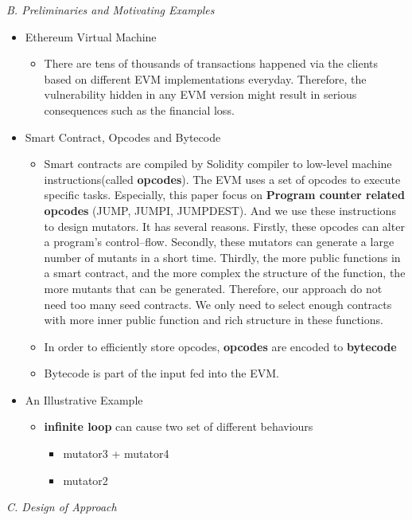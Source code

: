 \documentclass[a4paper]{article}
\begin{document}
	\textit{B. Preliminaries and Motivating Examples}
	\begin{itemize}
		\item Ethereum Virtual Machine
		\begin{itemize}
			\item  There are tens
			of thousands of transactions happened via the clients based on
			different EVM implementations everyday. Therefore, the vulnerability
			hidden in any EVM version might result in serious consequences such as the financial loss.
		\end{itemize}
		\item Smart Contract, Opcodes and Bytecode
		\begin{itemize}
			\item Smart contracts are compiled by Solidity compiler to low-level machine instructions(called \textbf{opcodes}). The EVM uses a set of opcodes to execute specific tasks. Especially, this paper focus on \textbf{Program counter related opcodes} (JUMP, JUMPI, JUMPDEST). And we use these instructions to design mutators. It has several reasons. Firstly, these opcodes can alter a program's control--flow. Secondly, these mutators can generate a large number of mutants in a short time. Thirdly, 
			the more public functions in a smart contract, and the more complex the structure of the function, the more mutants that can be generated. Therefore, our approach do not need too many seed contracts. We only need to select enough contracts with more inner public function and rich structure in these functions.
			\item In order to efficiently store opcodes, \textbf{opcodes} are encoded to \textbf{bytecode}
			\item Bytecode is part of the input fed into the EVM.
		\end{itemize}
		\item{An Illustrative Example}
		\begin{itemize}
			\item \textbf{infinite loop} can cause two set of different behaviours
			\begin{itemize}
				\item mutator3 + mutator4
				\item mutator2
			\end{itemize}
		\end{itemize}
	\end{itemize}
	\textit{C. Design of Approach}
\end{document}
